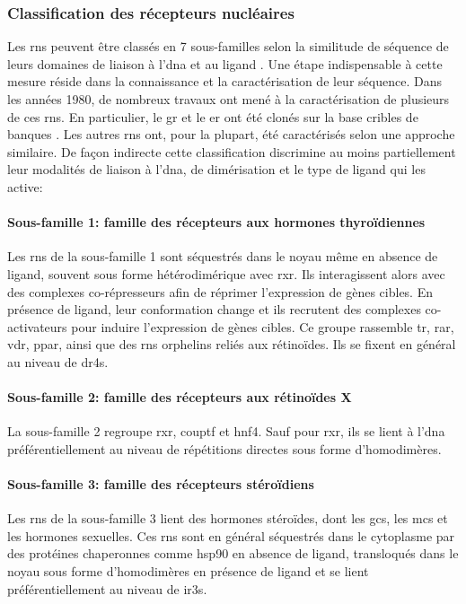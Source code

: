 \documentclass[../main.tex]{subfiles}
\begin{document}
		\subsubsection{Classification des récepteurs nucléaires}
			Les \glspl{rn} peuvent être classés en 7 sous-familles selon la similitude de séquence de leurs domaines de liaison à l'\gls{dna} et au ligand \citep{Laudet1997,Committee1999}.
			Une étape indispensable à cette mesure réside dans la connaissance et la caractérisation de leur séquence.
			Dans les années 1980, de nombreux travaux ont mené à la caractérisation de plusieurs de ces \glspl{rn}.
			En particulier, le \gls{gr} et le \gls{er} ont été clonés sur la base cribles de banques \citep{Hollenberg1985, Green1986}.
			Les autres \glspl{rn} ont, pour la plupart, été caractérisés selon une approche similaire.
			De façon indirecte cette classification discrimine au moins partiellement leur modalités de liaison à l'\gls{dna}, de dimérisation et le type de ligand qui les active:

			\paragraph{Sous-famille 1: famille des récepteurs aux hormones thyroïdiennes}
				Les \glspl{rn} de la sous-famille 1 sont séquestrés dans le noyau même en absence de ligand, souvent sous forme hétérodimérique avec \gls{rxr}.
				Ils interagissent alors avec des complexes co-répresseurs afin de réprimer l'expression de gènes cibles.
				En présence de ligand, leur conformation change et ils recrutent des complexes co-activateurs pour induire l'expression de gènes cibles.
				Ce groupe rassemble \gls{tr}, \gls{rar}, \gls{vdr}, \gls{ppar}, ainsi que des \glspl{rn} orphelins reliés aux rétinoïdes. Ils se fixent en général au niveau de \glspl{dr4}.

			\paragraph{Sous-famille 2: famille des récepteurs aux rétinoïdes X}
				La sous-famille 2 regroupe \gls{rxr}, \gls{couptf} et \gls{hnf4}.
				Sauf pour \gls{rxr}, ils se lient à l'\gls{dna} préférentiellement au niveau de répétitions directes sous forme d'homodimères.

			\paragraph{Sous-famille 3: famille des récepteurs stéroïdiens}
				Les \glspl{rn} de la sous-famille 3 lient des hormones stéroïdes, dont les \glspl{gc}, les \glspl{mc} et les hormones sexuelles. Ces \glspl{rn} sont en général séquestrés dans le cytoplasme par des protéines chaperonnes comme \gls{hsp90} en absence de ligand, transloqués dans le noyau sous forme d'homodimères en présence de ligand et se lient préférentiellement au niveau de \glspl{ir3}.
\end{document}
